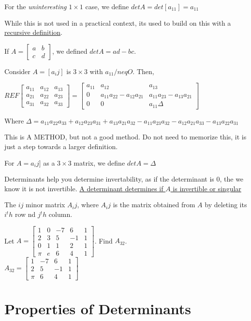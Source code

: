 \documentclass{report}
\begin{document}
\begin{definition}
For the \emph{uninteresting} $1\times 1$ case, we define $det A = det [a_11] = a_11$
\end{definition}
\begin{remark}
While this is not used in a practical context, its used to build on this with a \underline{recursive definition}.
\end{remark}
\begin{definition}
If $A=\begin{bmatrix}
a & b \\
c & d
\end{bmatrix}$, we defined $det A = ad - bc$.
\end{definition}

Consider $A=[a_ij]$ is $3\times 3$ with $a_11/neq O$. Then,
\begin{center}
	$REF\begin{bmatrix}
	a_11 & a_12 & a_13 \\
	a_21 & a_22 & a_23 \\
	a_31 & a_32 & a_33
	\end{bmatrix} =
	\begin{bmatrix}
	a_11 & a_12 & a_13 \\
	0 & a_11a_22-a_12a_21 & a_11a_23-a_13a_21 \\
	0 & 0 & a_11\Delta 
	\end{bmatrix}$
\end{center}
Where $\Delta = a_11a_22a_33+a_12a_23a_31+a_13a_21a_32-a_11a_23a_32-a_12a_21a_33-a_13a_22a_31$
\begin{remark}
This is A METHOD, but not a good method. Do not need to memorize this, it is just a step towards a larger definition.
\end{remark}

\begin{definition}
For $A=a_ij]$ as a $3\times 3$ matrix, we define $det A=\Delta$
\end{definition}

Determinants help you determine invertability, as if the determinant is 0, the we know it is not invertible. \underline{A determinant determines if $A$ is invertible or singular}

\begin{definition}
The $ij$ minor matrix $A_ij$, where $A_ij$ is the matrix obtained from $A$ by deleting its $i^th$ row nd $j^th$ column.
\end{definition}

\begin{example}
Let $A=\begin{bmatrix}
1 & 0 & -7 & 6 & 1 \\
2 & 3 & 5 & -1 & 1 \\
0 & 1 & 1 & 2 & 1 \\
\pi & e & 6 & 4 & 1
\end{bmatrix}$. Find $A_{32}$.\\
$A_{32}=\begin{bmatrix}
1 & -7 & 6 & 1 \\
2 & 5 & -1 & 1 \\
\pi & 6 & 4 & 1
\end{bmatrix}$
\end{example}

\section{Properties of Determinants}
\end{document}
